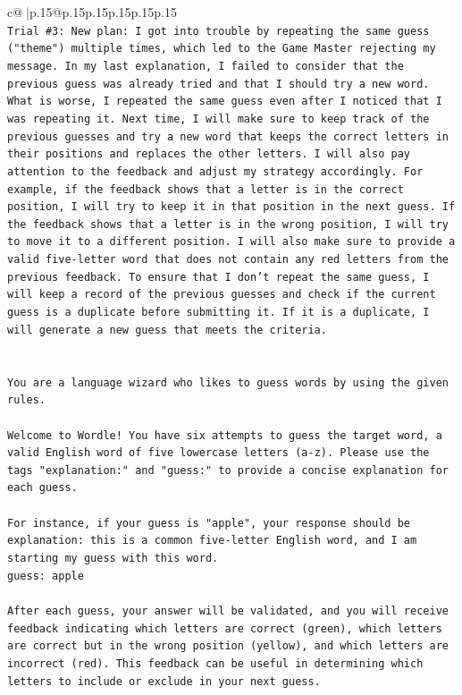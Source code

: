 \documentclass{article}
\begin{document}
{\begin{supertabular}{c@{$\;$}|p{.15\linewidth}@{}p{.15\linewidth}p{.15\linewidth}p{.15\linewidth}p{.15\linewidth}p{.15\linewidth}}
{{{\\ 
\texttt{Trial \#3: New plan: I got into trouble by repeating the same guess ("theme") multiple times, which led to the Game Master rejecting my message. In my last explanation, I failed to consider that the previous guess was already tried and that I should try a new word. What is worse, I repeated the same guess even after I noticed that I was repeating it. Next time, I will make sure to keep track of the previous guesses and try a new word that keeps the correct letters in their positions and replaces the other letters. I will also pay attention to the feedback and adjust my strategy accordingly. For example, if the feedback shows that a letter is in the correct position, I will try to keep it in that position in the next guess. If the feedback shows that a letter is in the wrong position, I will try to move it to a different position. I will also make sure to provide a valid five{-}letter word that does not contain any red letters from the previous feedback. To ensure that I don't repeat the same guess, I will keep a record of the previous guesses and check if the current guess is a duplicate before submitting it. If it is a duplicate, I will generate a new guess that meets the criteria.} \\
\\ 
\\ 
\texttt{You are a language wizard who likes to guess words by using the given rules.} \\
\\ 
\texttt{Welcome to Wordle! You have six attempts to guess the target word, a valid English word of five lowercase letters (a{-}z). Please use the tags "explanation:" and "guess:" to provide a concise explanation for each guess.} \\
\\ 
\texttt{For instance, if your guess is "apple", your response should be} \\
\texttt{explanation: this is a common five{-}letter English word, and I am starting my guess with this word.} \\
\texttt{guess: apple} \\
\\ 
\texttt{After each guess, your answer will be validated, and you will receive feedback indicating which letters are correct (green), which letters are correct but in the wrong position (yellow), and which letters are incorrect (red). This feedback can be useful in determining which letters to include or exclude in your next guess.} \\
}}}
\end{supertabular}}
\end{document}
